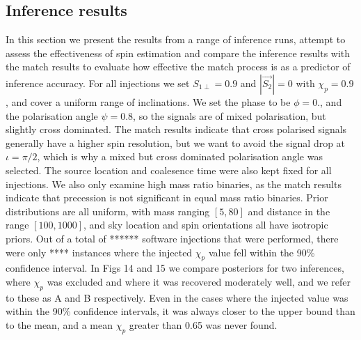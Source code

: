 \documentclass[11pt]{article}
\begin{document}
\subsection{Inference results}
In this section we present the results from a range of inference runs, attempt to assess the effectiveness of spin estimation and compare the inference results with the match results to evaluate how effective the match process is as a predictor of inference accuracy. For all injections we set $S_{1\perp}=0.9$ and $|\vec{S_2}|=0$ with $\chi_p=0.9$, and cover a uniform range of inclinations. We set the phase to be $\phi=0.$, and the polarisation angle $\psi=0.8$, so the signals are of mixed polarisation, but slightly cross dominated. The match results indicate that cross polarised signals generally have a higher spin resolution, but we want to avoid the signal drop at $\iota=\pi/2$, which is why a mixed but cross dominated polarisation angle was selected. The source location and coalesence time were also kept fixed for all injections. We also only examine high mass ratio binaries, as the match results indicate that precession is not significant in equal mass ratio binaries. Prior distributions are all uniform, with mass ranging $[5,80]$ and distance in the range $[100,1000]$, and sky location and spin orientations all have isotropic priors. Out of a total of ****** software injections that were performed, there were only **** instances where the injected $\chi_p$ value fell within the 90\% confidence interval. In Figs 14 and 15 we compare posteriors for two inferences, where $\chi_p$ was excluded and where it was recovered moderately well, and we refer to these as A and B respectively. Even in the cases where the injected value was within the 90\% confidence intervals, it was always closer to the upper bound than to the mean, and a mean $\chi_p$ greater than 0.65 was never found.
\end{document}
